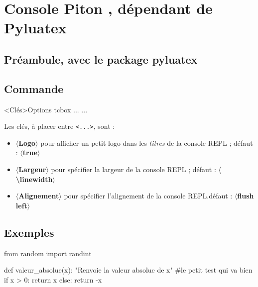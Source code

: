 \documentclass[french,a4paper,10pt]{article}
\begin{document}
\pagebreak

\section{Console \og Piton \fg{}, dépendant de Pyluatex}

\subsection{Préambule, avec le package pyluatex}

{\small {}}

\subsection{Commande}

{\small \begin{codehigh}
\begin{ConsolePiton}<Clés>{Options tcbox}
...
...
\end{ConsolePiton}
\end{codehigh}}

\medskip

Les clés, à placer entre \texttt{<...>}, sont :

\begin{itemize}
	\item \textbf{\textsf{$\langle$Logo$\rangle$}} pour afficher un petit logo dans les \textit{titres} de la console REPL ; \hfill{}défaut : \textbf{\textsf{$\langle$true$\rangle$}}
	\item \textbf{\textsf{$\langle$Largeur$\rangle$}} pour spécifier la largeur de la console REPL ; \hfill{}défaut : \textbf{\textsf{$\langle$\textbackslash{}linewidth$\rangle$}}
	\item \textbf{\textsf{$\langle$Alignement$\rangle$}} pour spécifier l'alignement de la console REPL.\hfill{}défaut : \textbf{\textsf{$\langle$flush left$\rangle$}}
\end{itemize}

\subsection{Exemples}

{\small \begin{codehigh}
\begin{python}
from random import randint

def valeur_absolue(x):
    "Renvoie la valeur absolue de x"
    #le petit test qui va bien
    if x > 0:
        return x
    else:
        return -x
\end{python}
\end{codehigh}}
\end{document}

